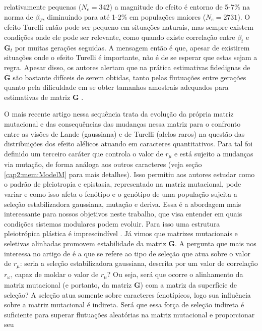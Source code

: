 relativamente pequenas ($N_e=342$) a magnitude do efeito é entorno de
5-7\% na norma de $\beta_T$, diminuindo para até 1-2\% em populações
maiores ($N_e=2731$).
O efeito Turelli então pode ser pequeno em situações naturais, mas
sempre existem condições onde ele pode ser relevante, como quando existe
correlação entre $\beta_t$ e $\mathbf{G}_t$ por muitas gerações seguidas.
A mensagem então é que, apesar de existirem situações onde o efeito
Turelli é importante, não é de se esperar que estas sejam a regra.
Apesar disso, os autores alertam que na prática estimativas fidedignas
de $\overline {\mathbf{G}}$ são bastante difíceis de serem obtidas, tanto pelas
flutuações entre gerações quanto pela dificuldade em se obter tamanhos
amostrais adequados para estimativas de matriz $\mathbf{G}$ \citep{Marroig2012}.

O mais recente artigo nessa sequência \citep{Jones2007} trata da
evolução da própria matriz mutacional e das consequências das mudanças
nessa matriz para o confronto entre as visões de Lande (gaussiana) e de
Turelli (alelos raros) na questão das distribuições dos efeito alélicos
atuando em caracteres quantitativos.
Para tal foi definido um terceiro caráter que controla o valor de
$r_\mu$ e está sujeito a mudanças via mutação, de forma análoga aos
outros caracteres (veja seção \ref{cap2:mem:ModelM} para mais detalhes).
Isso permitiu aos autores estudar como o padrão de pleiotropia e
epistasia, representado na matriz mutacional, pode variar e como isso
afeta o fenótipo e o genótipo de uma população sujeita a seleção
estabilizadora gaussiana, mutação e deriva.
Essa é a abordagem mais interessante para nossos objetivos neste
trabalho, que visa entender em quais condições sistemas modulares podem
evoluir.
Para isso uma estrutura pleiotrópica plástica é imprescindível
\citep{Wagner1996, Pavlicev2011a}.
Já vimos que matrizes mutacionais e seletivas alinhadas promovem
estabilidade da matriz $\mathbf{G}$.
A pergunta que mais nos interessa no artigo de \cite{Jones2007} é a que
se refere ao tipo de seleção que atua sobre o valor de $r_\mu$: seria a
seleção estabilizadora gaussiana, descrita por um valor de correlação
$r_\omega$, capaz de moldar o valor de $r_\mu$? 
Ou seja, será que ocorre o alinhamento da matriz mutacional (e portanto,
da matriz $\mathbf{G}$)  com a matriz da superfície de seleção? 
A seleção atua somente sobre caracteres fenotípicos, logo sua influência
sobre a matriz mutacional é indireta.
Será que essa força de seleção indireta é suficiente para superar
flutuações aleatórias na matriz mutacional e proporcionar seu
